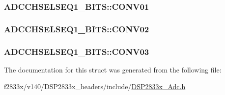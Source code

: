 \subsubsection[{C\+O\+N\+V01}]{ A\+D\+C\+C\+H\+S\+E\+L\+S\+E\+Q1\+\_\+\+B\+I\+T\+S\+::\+C\+O\+N\+V01}\label{struct_a_d_c_c_h_s_e_l_s_e_q1___b_i_t_s_a81182d5f20c62d0070bfc355f924b26c}
\hypertarget{struct_a_d_c_c_h_s_e_l_s_e_q1___b_i_t_s_a52c1cf624126ad744e08aaea65f2b979}{}
\subsubsection[{C\+O\+N\+V02}]{ A\+D\+C\+C\+H\+S\+E\+L\+S\+E\+Q1\+\_\+\+B\+I\+T\+S\+::\+C\+O\+N\+V02}\label{struct_a_d_c_c_h_s_e_l_s_e_q1___b_i_t_s_a52c1cf624126ad744e08aaea65f2b979}
\hypertarget{struct_a_d_c_c_h_s_e_l_s_e_q1___b_i_t_s_af9b6d68ca43088439baff2b61c56182f}{}
\subsubsection[{C\+O\+N\+V03}]{ A\+D\+C\+C\+H\+S\+E\+L\+S\+E\+Q1\+\_\+\+B\+I\+T\+S\+::\+C\+O\+N\+V03}\label{struct_a_d_c_c_h_s_e_l_s_e_q1___b_i_t_s_af9b6d68ca43088439baff2b61c56182f}


The documentation for this struct was generated from the following file\+:\begin{DoxyCompactItemize}
\item 
f2833x/v140/\+D\+S\+P2833x\+\_\+headers/include/\hyperlink{_d_s_p2833x___adc_8h}{D\+S\+P2833x\+\_\+\+Adc.\+h}\end{DoxyCompactItemize}
